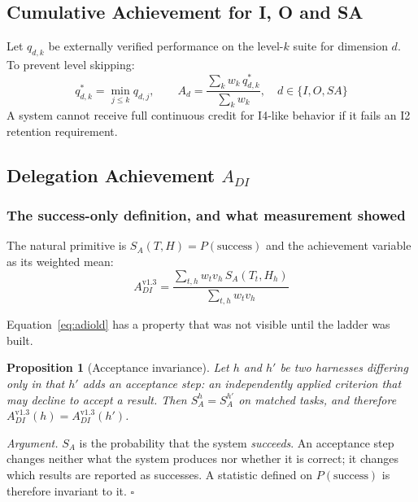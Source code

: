 \documentclass[11pt]{article}
\newtheorem{proposition}{Proposition}
\theoremstyle{definition}
\newcommand{\SA}{\ensuremath{S_A(T,H)}}
\begin{document}
\subsection{Cumulative Achievement for I, O and SA}

Let $q_{d,k}$ be externally verified performance on the level-$k$ suite for dimension $d$. To prevent level skipping:
\begin{equation}
q^{*}_{d,k} = \min_{j \le k} q_{d,j}, \qquad
A_d = \frac{\sum_k w_k\, q^{*}_{d,k}}{\sum_k w_k}, \quad d \in \{I,O,SA\}
\end{equation}
A system cannot receive full continuous credit for I4-like behavior if it fails an I2 retention requirement.

\subsection{Delegation Achievement \texorpdfstring{$A_{DI}$}{A-DI}}\label{sec:adi}

\subsubsection{The success-only definition, and what measurement showed}

The natural primitive is $\SA{} = P(\text{success})$ and the achievement variable as its weighted mean:
\begin{equation}
A_{DI}^{\text{v1.3}} = \frac{\sum_{t,h} w_t v_h\, S_A(T_t,H_h)}{\sum_{t,h} w_t v_h}
\label{eq:adiold}
\end{equation}

Equation~\eqref{eq:adiold} has a property that was not visible until the ladder was built.

\begin{proposition}[Acceptance invariance]\label{prop:blind}
Let $h$ and $h'$ be two harnesses differing only in that $h'$ adds an acceptance step: an independently applied criterion that may decline to accept a result. Then $S_A^{h} = S_A^{h'}$ on matched tasks, and therefore $A_{DI}^{\text{v1.3}}(h) = A_{DI}^{\text{v1.3}}(h')$.
\end{proposition}

\emph{Argument.} $S_A$ is the probability that the system \emph{succeeds}. An acceptance step changes neither what the system produces nor whether it is correct; it changes which results are reported as successes. A statistic defined on $P(\text{success})$ is therefore invariant to it. \hfill$\square$
\end{document}
